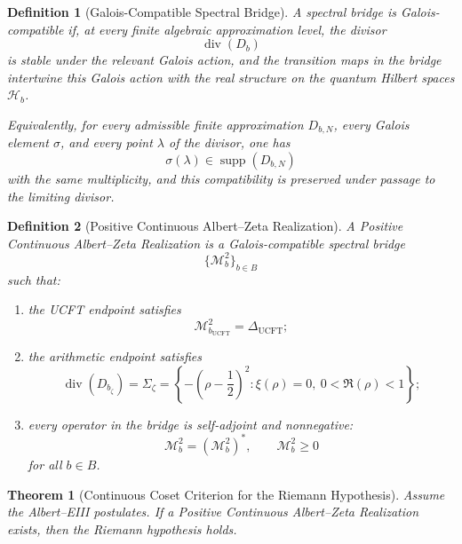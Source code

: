 \documentclass[pdflatex,sn-mathphys-num]{sn-jnl}
\theoremstyle{thmstyleone}
\newtheorem{theorem}{Theorem}
\theoremstyle{thmstylethree}%
\newtheorem{definition}[definition]{Definition}
\theoremstyle{thmstyletwo}%
\begin{document}
\begin{definition}[Galois-Compatible Spectral Bridge]
A spectral bridge is Galois-compatible if, at every finite algebraic
approximation level, the divisor
\[
\operatorname{div}(D_b)
\]
is stable under the relevant Galois action, and the transition maps in the
bridge intertwine this Galois action with the real structure on the quantum
Hilbert spaces \(\mathcal H_b\).

Equivalently, for every admissible finite approximation \(D_{b,N}\), every
Galois element \(\sigma\), and every point \(\lambda\) of the divisor, one has
\[
\sigma(\lambda)\in \operatorname{supp}(D_{b,N})
\]
with the same multiplicity, and this compatibility is preserved under passage
to the limiting divisor.
\end{definition}

\begin{definition}[Positive Continuous Albert--Zeta Realization]
\label{def:PositiveRealization}
A \emph{Positive Continuous Albert--Zeta Realization} is a Galois-compatible
spectral bridge
\[
\{\mathcal M_b^2\}_{b\in B}
\]
such that:
\begin{enumerate}
\item the UCFT endpoint satisfies
\[
\mathcal M_{b_{\mathrm{UCFT}}}^{2}
=
\Delta_{\mathrm{UCFT}};
\]
\item the arithmetic endpoint satisfies
\[
\operatorname{div}(D_{b_{\zeta}})
=
\Sigma_{\zeta}
=
\left\{
-\left(\rho-\frac12\right)^2:
\xi(\rho)=0,\ 0<\Re(\rho)<1
\right\};
\]
\item every operator in the bridge is self-adjoint and nonnegative:
\[
\mathcal M_b^2=\left(\mathcal M_b^2\right)^{*},
\qquad
\mathcal M_b^2\ge0
\]
for all \(b\in B\).
\end{enumerate}
\end{definition}

\begin{theorem}[Continuous Coset Criterion for the Riemann Hypothesis]
\label{thm:ContinuousCosetCriterion}
Assume the Albert--EIII postulates. If a Positive Continuous Albert--Zeta
Realization exists, then the Riemann hypothesis holds.
\end{theorem}
\end{document}
